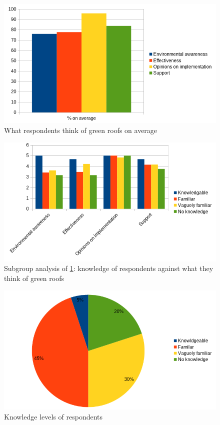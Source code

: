 \documentclass{article}
\begin{document}
\begin{multicols}{2}
  \begin{figure}
    \includegraphics[width=\linewidth]{responses-ave.png}
    \caption{What respondents think of green roofs on average}
    \label{fig:surv-resp}
  \end{figure}

  \begin{figure}
    \includegraphics[width=\linewidth]{knowledge-opinions.png}
    \caption{
      Subgroup analysis of \cref{fig:surv-resp}: knowledge of respondents
      against what they think of green roofs
    }
    \label{fig:know-opn}
  \end{figure}

  \begin{figure}
    \includegraphics[width=\linewidth]{knowledge.png}
    \caption{Knowledge levels of respondents}
    \label{fig:know-levels}
  \end{figure}


\end{multicols}
\end{document}
